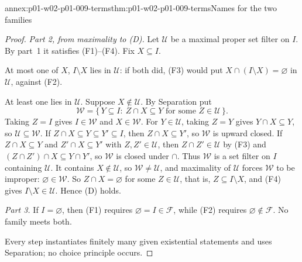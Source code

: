 \begin{annexitem}{annex:p01-w02-p01-009-terms}{thm:p01-w02-p01-009-terms}{Names for the two families}
\begin{proof}
\emph{Part 2, from maximality to (D).} Let \(\mathcal U\) be a maximal
proper set filter on \(I\). By part~1 it satisfies (F1)--(F4). Fix
\(X\subseteq I\).

At most one of \(X\), \(I\setminus X\) lies in \(\mathcal U\): if both did,
(F3) would put \(X\cap(I\setminus X)=\varnothing\) in \(\mathcal U\),
against (F2).

At least one lies in \(\mathcal U\). Suppose \(X\notin\mathcal U\). By
Separation put
\[
  \mathcal W=\{\,Y\subseteq I:\ Z\cap X\subseteq Y\text{ for some }
  Z\in\mathcal U\,\}.
\]
Taking \(Z=I\) gives \(I\in\mathcal W\) and \(X\in\mathcal W\). For
\(Y\in\mathcal U\), taking \(Z=Y\) gives \(Y\cap X\subseteq Y\), so
\(\mathcal U\subseteq\mathcal W\). If \(Z\cap X\subseteq Y\subseteq Y'\subseteq I\),
then \(Z\cap X\subseteq Y'\), so \(\mathcal W\) is upward closed. If
\(Z\cap X\subseteq Y\) and \(Z'\cap X\subseteq Y'\) with
\(Z,Z'\in\mathcal U\), then \(Z\cap Z'\in\mathcal U\) by (F3) and
\((Z\cap Z')\cap X\subseteq Y\cap Y'\), so \(\mathcal W\) is closed under
\(\cap\). Thus \(\mathcal W\) is a set filter on \(I\) containing
\(\mathcal U\). It contains \(X\notin\mathcal U\), so
\(\mathcal W\ne\mathcal U\), and maximality of \(\mathcal U\) forces
\(\mathcal W\) to be improper: \(\varnothing\in\mathcal W\). So
\(Z\cap X=\varnothing\) for some \(Z\in\mathcal U\), that is,
\(Z\subseteq I\setminus X\), and (F4) gives \(I\setminus X\in\mathcal U\).
Hence (D) holds.

\emph{Part 3.} If \(I=\varnothing\), then (F1) requires
\(\varnothing=I\in\mathcal F\), while (F2) requires
\(\varnothing\notin\mathcal F\). No family meets both.

Every step instantiates finitely many given existential statements and uses
Separation; no choice principle occurs.
\end{proof}
\end{annexitem}

